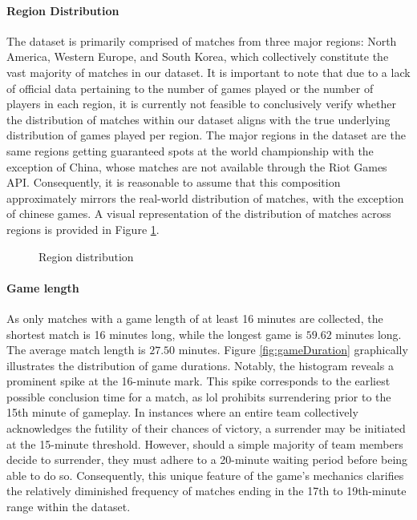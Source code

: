\documentclass[12pt, a4paper, headinclude, twoside, plainheadsepline, open=right, numbers=noenddot, hidelinks, toc=listof, toc=bibliography]{scrreprt}
\begin{document}
\paragraph{Region Distribution}
The dataset is primarily comprised of matches from three major regions: North America, Western Europe, and South Korea, which collectively constitute the vast majority of matches in our dataset. 
It is important to note that due to a lack of official data pertaining to the number of games played or the number of players in each region, it is currently not feasible to conclusively verify whether the distribution of matches within our dataset aligns with the true underlying distribution of games played per region.
The major regions in the dataset are the same regions getting guaranteed spots at the world championship \cite{2023LeagueLegends2023} with the exception of China, whose matches are not available through the Riot Games API.
Consequently, it is reasonable to assume that this composition approximately mirrors the real-world distribution of matches, with the exception of chinese games.
A visual representation of the distribution of matches across regions is provided in Figure \ref{fig:platformId}.


\begin{figure}[ht]

\caption{Region distribution}
\label{fig:platformId}
\end{figure}

\paragraph{Game length}
As only matches with a game length of at least 16 minutes are collected, the shortest match is 16 minutes long, while the longest game is $59.62$ minutes long.
The average match length is $27.50$ minutes.
Figure \ref{fig:gameDuration} graphically illustrates the distribution of game durations. 
Notably, the histogram reveals a prominent spike at the 16-minute mark.
This spike corresponds to the earliest possible conclusion time for a match, as \ac{lol} prohibits surrendering prior to the 15th minute of gameplay. 
In instances where an entire team collectively acknowledges the futility of their chances of victory, a surrender may be initiated at the 15-minute threshold.
However, should a simple majority of team members decide to surrender, they must adhere to a 20-minute waiting period before being able to do so. 
Consequently, this unique feature of the game's mechanics clarifies the relatively diminished frequency of matches ending in the 17th to 19th-minute range within the dataset.
\end{document}
